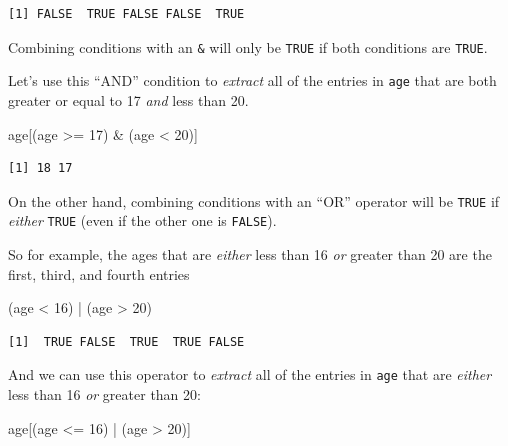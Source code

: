 \documentclass[
  letterpaper,
  DIV=11,
  numbers=noendperiod]{scrreprt}
\newenvironment{Shaded}{\begin{snugshade}}{\end{snugshade}}
\newcommand{\DecValTok}[1]{\textcolor[rgb]{0.68,0.00,0.00}{#1}}
\newcommand{\NormalTok}[1]{\textcolor[rgb]{0.00,0.23,0.31}{#1}}
\newcommand{\SpecialCharTok}[1]{\textcolor[rgb]{0.37,0.37,0.37}{#1}}
\begin{document}
\begin{verbatim}
[1] FALSE  TRUE FALSE FALSE  TRUE
\end{verbatim}

Combining conditions with an \texttt{\&} will only be \texttt{TRUE} if
both conditions are \texttt{TRUE}.

Let's use this ``AND'' condition to \emph{extract} all of the entries in
\texttt{age} that are both greater or equal to 17 \emph{and} less than
20.

\begin{Shaded}
\begin{Highlighting}[]
\NormalTok{age[(age }\SpecialCharTok{\textgreater{}=} \DecValTok{17}\NormalTok{) }\SpecialCharTok{\&}\NormalTok{ (age }\SpecialCharTok{\textless{}} \DecValTok{20}\NormalTok{)]}
\end{Highlighting}
\end{Shaded}

\begin{verbatim}
[1] 18 17
\end{verbatim}

On the other hand, combining conditions with an \texttt{\textbar{}}
``OR'' operator will be \texttt{TRUE} if \emph{either} \texttt{TRUE}
(even if the other one is \texttt{FALSE}).

So for example, the ages that are \emph{either} less than 16 \emph{or}
greater than 20 are the first, third, and fourth entries

\begin{Shaded}
\begin{Highlighting}[]
\NormalTok{(age }\SpecialCharTok{\textless{}} \DecValTok{16}\NormalTok{) }\SpecialCharTok{|}\NormalTok{ (age }\SpecialCharTok{\textgreater{}} \DecValTok{20}\NormalTok{)}
\end{Highlighting}
\end{Shaded}

\begin{verbatim}
[1]  TRUE FALSE  TRUE  TRUE FALSE
\end{verbatim}

And we can use this \texttt{\textbar{}} operator to \emph{extract} all
of the entries in \texttt{age} that are \emph{either} less than 16
\emph{or} greater than 20:

\begin{Shaded}
\begin{Highlighting}[]
\NormalTok{age[(age }\SpecialCharTok{\textless{}=} \DecValTok{16}\NormalTok{) }\SpecialCharTok{|}\NormalTok{ (age }\SpecialCharTok{\textgreater{}} \DecValTok{20}\NormalTok{)]}
\end{Highlighting}
\end{Shaded}
\end{document}
